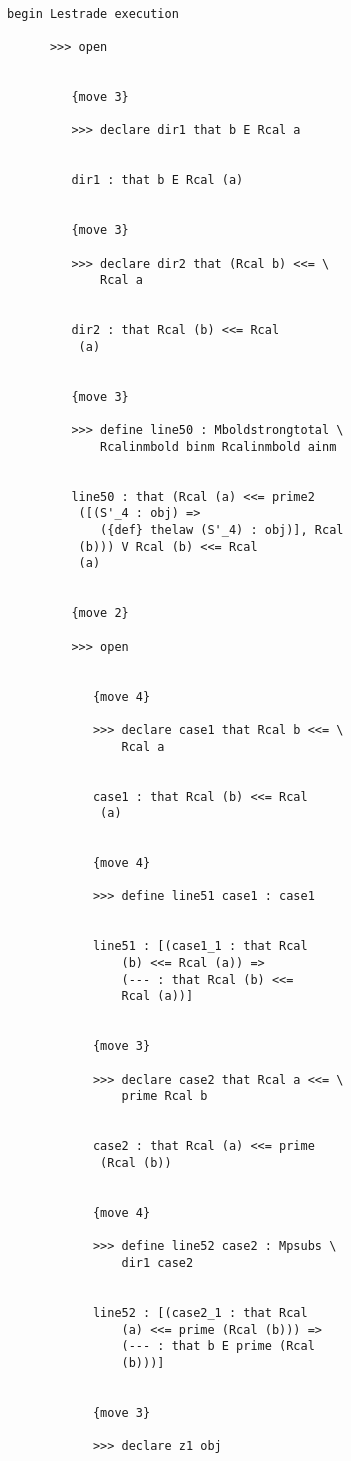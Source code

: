 \documentclass[12pt]{article}
\begin{document}
\begin{verbatim}

begin Lestrade execution

      >>> open


         {move 3}

         >>> declare dir1 that b E Rcal a


         dir1 : that b E Rcal (a)


         {move 3}

         >>> declare dir2 that (Rcal b) <<= \
             Rcal a


         dir2 : that Rcal (b) <<= Rcal 
          (a)


         {move 3}

         >>> define line50 : Mboldstrongtotal \
             Rcalinmbold binm Rcalinmbold ainm


         line50 : that (Rcal (a) <<= prime2 
          ([(S'_4 : obj) => 
             ({def} thelaw (S'_4) : obj)], Rcal 
          (b))) V Rcal (b) <<= Rcal 
          (a)


         {move 2}

         >>> open


            {move 4}

            >>> declare case1 that Rcal b <<= \
                Rcal a


            case1 : that Rcal (b) <<= Rcal 
             (a)


            {move 4}

            >>> define line51 case1 : case1


            line51 : [(case1_1 : that Rcal 
                (b) <<= Rcal (a)) => 
                (--- : that Rcal (b) <<= 
                Rcal (a))]


            {move 3}

            >>> declare case2 that Rcal a <<= \
                prime Rcal b


            case2 : that Rcal (a) <<= prime 
             (Rcal (b))


            {move 4}

            >>> define line52 case2 : Mpsubs \
                dir1 case2


            line52 : [(case2_1 : that Rcal 
                (a) <<= prime (Rcal (b))) => 
                (--- : that b E prime (Rcal 
                (b)))]


            {move 3}

            >>> declare z1 obj



\end{verbatim}
\end{document}
